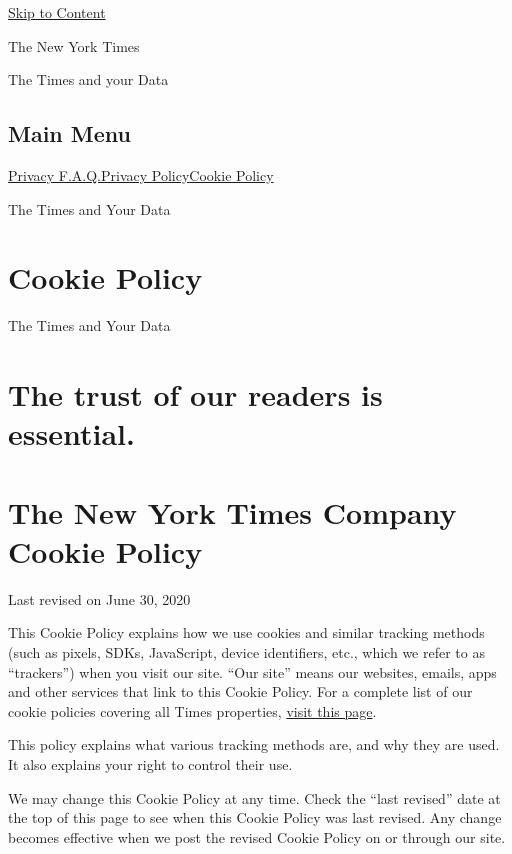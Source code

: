 \protect\hyperlink{main-content}{Skip to Content}

The New York Times

The Times and your Data

\hypertarget{main-menu}{%
\subsection{Main Menu}\label{main-menu}}

\href{/privacy}{Privacy F.A.Q.}\href{/privacy/privacy-policy}{Privacy
Policy}\href{/privacy/cookie-policy}{Cookie Policy}

The Times and Your Data

\hypertarget{cookie-policy}{%
\section{Cookie Policy}\label{cookie-policy}}

The Times and Your Data

\hypertarget{the-trust-of-our-readers-is-essential}{%
\section{The trust of our readers is
essential.}\label{the-trust-of-our-readers-is-essential}}

\hypertarget{the-new-york-times-company-cookie-policy}{%
\section{The New York Times Company Cookie
Policy}\label{the-new-york-times-company-cookie-policy}}

Last revised on June 30, 2020

This Cookie Policy explains how we use cookies and similar tracking
methods (such as pixels, SDKs, JavaScript, device identifiers, etc.,
which we refer to as ``trackers'') when you visit our site. ``Our site''
means our websites, emails, apps and other services that link to this
Cookie Policy. For a complete list of our cookie policies covering all
Times properties,
\href{https://www.nytimes3xbfgragh.onion/subscription/dg-cookie-policy/cookie-policy.html}{visit
this page}.

This policy explains what various tracking methods are, and why they are
used. It also explains your right to control their use.

We may change this Cookie Policy at any time. Check the ``last revised''
date at the top of this page to see when this Cookie Policy was last
revised. Any change becomes effective when we post the revised Cookie
Policy on or through our site.

